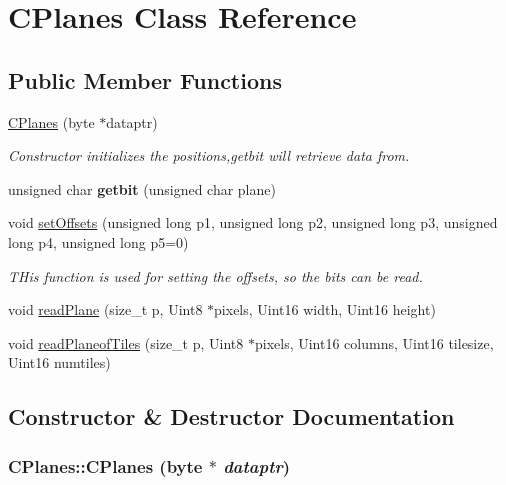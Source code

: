 \hypertarget{class_c_planes}{
\section{CPlanes Class Reference}
\label{class_c_planes}
}
\subsection*{Public Member Functions}
\begin{DoxyCompactItemize}
\item 
\hyperlink{class_c_planes_a553dda7df33570d8c29ed6d5818a5d79}{CPlanes} (byte $\ast$dataptr)
\begin{DoxyCompactList}\small\item\em Constructor initializes the positions,getbit will retrieve data from. \item\end{DoxyCompactList}\item 
\hypertarget{class_c_planes_a01732fdeb580897fe1504b88e72ca962}{
unsigned char {\bfseries getbit} (unsigned char plane)}
\label{class_c_planes_a01732fdeb580897fe1504b88e72ca962}

\item 
void \hyperlink{class_c_planes_aa1713e4cec9409fc7aa5363d798da3d3}{setOffsets} (unsigned long p1, unsigned long p2, unsigned long p3, unsigned long p4, unsigned long p5=0)
\begin{DoxyCompactList}\small\item\em THis function is used for setting the offsets, so the bits can be read. \item\end{DoxyCompactList}\item 
void \hyperlink{class_c_planes_a87f413375d2b1197590983a7f48c7e97}{readPlane} (size\_\-t p, Uint8 $\ast$pixels, Uint16 width, Uint16 height)
\item 
void \hyperlink{class_c_planes_ab3470959e52a76f407078df080aa5838}{readPlaneofTiles} (size\_\-t p, Uint8 $\ast$pixels, Uint16 columns, Uint16 tilesize, Uint16 numtiles)
\end{DoxyCompactItemize}


\subsection{Constructor \& Destructor Documentation}
\hypertarget{class_c_planes_a553dda7df33570d8c29ed6d5818a5d79}{
\subsubsection[{CPlanes}]{\setlength{\rightskip}{0pt plus 5cm}CPlanes::CPlanes (byte $\ast$ {\em dataptr})}}
\label{class_c_planes_a553dda7df33570d8c29ed6d5818a5d79}


